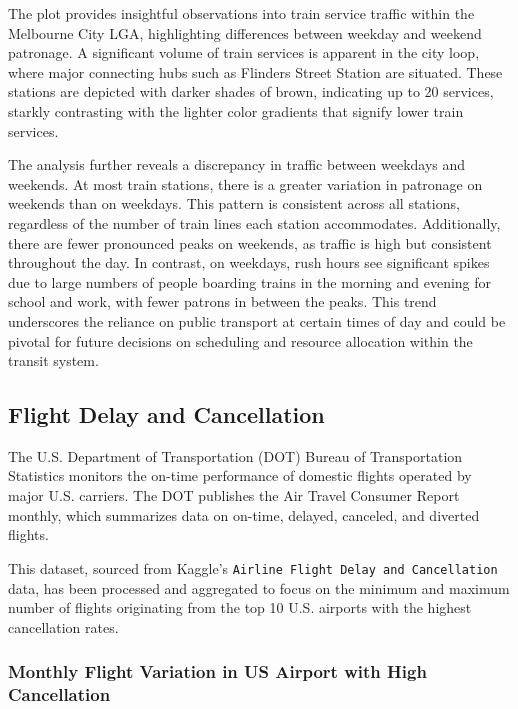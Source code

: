 The plot provides insightful observations into train service traffic within the Melbourne City LGA, highlighting differences between weekday and weekend patronage. A significant volume of train services is apparent in the city loop, where major connecting hubs such as Flinders Street Station are situated. These stations are depicted with darker shades of brown, indicating up to 20 services, starkly contrasting with the lighter color gradients that signify lower train services.

The analysis further reveals a discrepancy in traffic between weekdays and weekends. At most train stations, there is a greater variation in patronage on weekends than on weekdays. This pattern is consistent across all stations, regardless of the number of train lines each station accommodates. Additionally, there are fewer pronounced peaks on weekends, as traffic is high but consistent throughout the day. In contrast, on weekdays, rush hours see significant spikes due to large numbers of people boarding trains in the morning and evening for school and work, with fewer patrons in between the peaks. This trend underscores the reliance on public transport at certain times of day and could be pivotal for future decisions on scheduling and resource allocation within the transit system.

\subsection{Flight Delay and Cancellation}\label{flight-delay-and-cancellation}

The U.S. Department of Transportation (DOT) Bureau of Transportation Statistics monitors the on-time performance of domestic flights operated by major U.S. carriers. The DOT publishes the Air Travel Consumer Report monthly, which summarizes data on on-time, delayed, canceled, and diverted flights.

This dataset, sourced from Kaggle's \texttt{Airline\ Flight\ Delay\ and\ Cancellation} data, has been processed and aggregated to focus on the minimum and maximum number of flights originating from the top 10 U.S. airports with the highest cancellation rates.

\subsubsection{Monthly Flight Variation in US Airport with High Cancellation}\label{monthly-flight-variation-in-us-airport-with-high-cancellation}

